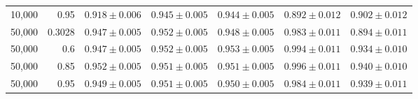 {\begin{tabular}{rrrrrrr}
10{,}000 & 0.95 & $0.918 \pm 0.006$ & $0.945 \pm 0.005$ & $0.944 \pm 0.005$ & $0.892 \pm 0.012$ & $0.902 \pm 0.012$ \\
50{,}000 & 0.3028 & $0.947 \pm 0.005$ & $0.952 \pm 0.005$ & $0.948 \pm 0.005$ & $0.983 \pm 0.011$ & $0.894 \pm 0.011$ \\
50{,}000 & 0.6 & $0.947 \pm 0.005$ & $0.952 \pm 0.005$ & $0.953 \pm 0.005$ & $0.994 \pm 0.011$ & $0.934 \pm 0.010$ \\
50{,}000 & 0.85 & $0.952 \pm 0.005$ & $0.951 \pm 0.005$ & $0.951 \pm 0.005$ & $0.996 \pm 0.011$ & $0.940 \pm 0.010$ \\
50{,}000 & 0.95 & $0.949 \pm 0.005$ & $0.951 \pm 0.005$ & $0.950 \pm 0.005$ & $0.984 \pm 0.011$ & $0.939 \pm 0.011$ \\
\bottomrule
\end{tabular}}
